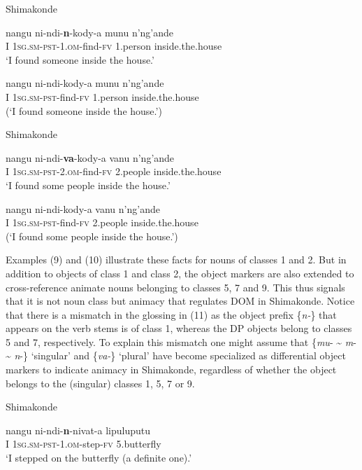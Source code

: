 \documentclass[output=paper]{langsci/langscibook}
\begin{document}
{Shimakonde}

\ea
\gll nangu       ni-ndi-\textbf{n}{}-kody-a                      munu            n'ng'ande\\
     I               \textsc{1sg.sm-pst}{}-1.\textsc{om}{}-find-\textsc{fv}       1.person       inside.the.house\\
\glt ‘I found someone inside the house.’
\z

\ea
\gll *nangu     ni-ndi-kody-a                         munu            n'ng'ande\\
     I               \textsc{1sg.sm-pst}{}-find-\textsc{fv}                1.person       inside.the.house\\
\glt (‘I found someone inside the house.’)
\z

{Shimakonde}

\ea
\gll nangu      ni-ndi-\textbf{va}{}-kody-a                     vanu             n'ng'ande\\
     I              \textsc{1sg.sm-pst-2.om}{}-find-\textsc{fv}        2.people       inside.the.house\\
\glt ‘I found some people inside the house.’
\z

\ea
\gll *nangu     ni-ndi-kody-a                        vanu              n'ng'ande\\
     I               \textsc{1sg.sm-pst}{}-find-\textsc{fv}               2.people        inside.the.house\\
\glt (‘I found some people inside the house.’)
\z

Examples (9) {and }(10) {}illustrate these facts for nouns of classes 1 and 2. But in addition to objects of class 1 and class 2, the object markers are also extended to cross-reference animate nouns belonging to classes 5, 7 and 9. This thus signals that {it is not noun class but animacy }that regulates DOM in Shimakonde. Notice that there is a mismatch in the glossing in (11) as the object prefix  \{{\textit{n-}}\} that appears on the verb stems is of class 1, whereas the DP objects belong to classes 5 and 7, respectively. To explain this mismatch one might assume that \{{\textit{mu}}{}- {\textasciitilde} {\textit{m}}{}- {\textasciitilde} {\textit{n}}{}-\} ‘singular’ and \{\textit{va-}\} ‘plural’ have become specialized as differential object markers to indicate animacy in Shimakonde, regardless of whether the object belongs to the (singular) classes 1, 5, 7 or 9.

{Shimakonde}

\ea
\gll nangu        ni-ndi-\textbf{n}{}-nivat-a                           lipuluputu\\
     I                \textsc{1sg.sm-pst-1.om}{}-step-\textsc{fv}            5.butterfly\\
\glt ‘I stepped on the butterfly (a definite one).’
\z
\end{document}
